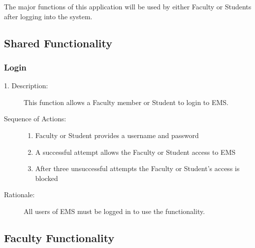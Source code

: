 
\label{sec:product_functions}


The major functions of this application will be used by either Faculty or Students
after logging into the system.

\subsection{Shared Functionality}
   \subsubsection{\large Login} 
   \begin{boxed} %
      \begin{description}
         \item[1. Description:\label{desc:login}]
      This function allows a Faculty member or Student to login to EMS.
      
         \item[Sequence of Actions:]\hspace{10cm}
      \begin{enumerate}
         \item Faculty or Student provides a username and password
         \item A successful attempt allows the Faculty or Student access to EMS
         \item After three unsuccessful attempts the Faculty or Student's access
            is blocked
      \end{enumerate}

         \item[Rationale:]
            All users of EMS must be logged in to use the functionality.
      \end{description}
   \end{boxed} %

\subsection{Faculty Functionality}

